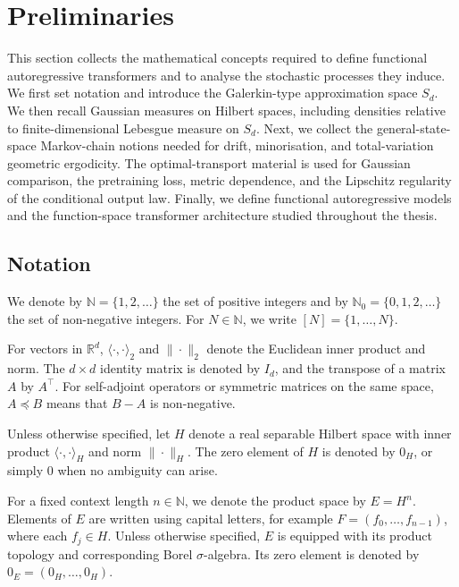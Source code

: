 \section{Preliminaries}\label{sec:Preliminaries}
This section collects the mathematical concepts required to define functional autoregressive transformers and to analyse the stochastic processes they induce. We first set notation and introduce the Galerkin-type approximation space \(S_d\). We then recall Gaussian measures on Hilbert spaces, including densities relative to finite-dimensional Lebesgue measure on \(S_d\). Next, we collect the general-state-space Markov-chain notions needed for drift, minorisation, and total-variation geometric ergodicity. The optimal-transport material is used for Gaussian comparison, the pretraining loss, metric dependence, and the Lipschitz regularity of the conditional output law. Finally, we define functional autoregressive models and the function-space transformer architecture studied throughout the thesis.

\subsection{Notation}\label{subsec:Notation}

We denote by \(\mathbb N=\{1,2,\ldots\}\) the set of positive integers and by \(\mathbb N_0=\{0,1,2,\ldots\}\) the set of non-negative integers. For \(N\in\mathbb N\), we write \([N]=\{1,\ldots,N\}\).

For vectors in \(\mathbb R^d\), \(\langle\cdot,\cdot\rangle_2\) and \(\|\cdot\|_2\) denote the Euclidean inner product and norm. The \(d\times d\) identity matrix is denoted by \(I_d\), and the transpose of a matrix \(A\) by \(A^\top\). For self-adjoint operators or symmetric matrices on the same space, \(A\preceq B\) means that \(B-A\) is non-negative.

Unless otherwise specified, let \(H\) denote a real separable Hilbert space with inner product \(\langle\cdot,\cdot\rangle_H\) and norm \(\|\cdot\|_H\). The zero element of \(H\) is denoted by \(0_H\), or simply \(0\) when no ambiguity can arise.

For a fixed context length \(n\in\mathbb N\), we denote the product space by \(E=H^n\). Elements of \(E\) are written using capital letters, for example \(F=(f_0,\ldots,f_{n-1})\), where each \(f_j\in H\). Unless otherwise specified, \(E\) is equipped with its product topology and corresponding Borel \(\sigma\)-algebra. Its zero element is denoted by \(0_E=(0_H,\ldots,0_H)\).

